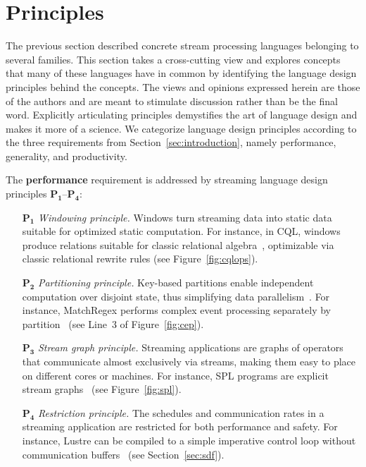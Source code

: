 \section{Principles}\label{sec:principles}

The previous section described concrete stream processing languages
belonging to several families. This section takes a cross-cutting view
and explores concepts that many of these languages have in common by
identifying the language design principles behind the concepts.
The views and opinions expressed herein are those of the authors and
are meant to stimulate discussion rather than be the final word.
Explicitly articulating principles demystifies the art of language
design and makes it more of a science. We categorize language design
principles according to the three requirements from
Section~\ref{sec:introduction}, namely performance, generality, and
productivity.

The \textbf{performance} requirement is addressed by streaming
language design principles $\mathbf{P_1}$--$\mathbf{P_4}$:
\begin{itemize}[leftmargin=6mm]
  \item[$\mathbf{P_1}$] \emph{Windowing principle.} Windows turn streaming
    data into static data suitable for optimized static computation.
    For instance, in CQL, windows produce relations suitable for
    classic relational algebra~\cite{arasu_babu_widom_2006},
    optimizable via classic relational rewrite rules (see
    Figure~\ref{fig:cqlops}).
  \item[$\mathbf{P_2}$] \emph{Partitioning principle.} Key-based partitions
    enable independent computation over disjoint state, thus
    simplifying data parallelism~\cite{schneider_et_al_2015}.
    For instance, MatchRegex performs complex event processing separately by
    partition~\cite{hirzel_2012} (see Line~3 of Figure~\ref{fig:cep}).
  \item[$\mathbf{P_3}$] \emph{Stream graph principle.} Streaming
    applications are graphs of operators that communicate almost
    exclusively via streams, making them easy to place on different
    cores or machines. For instance, SPL programs are explicit stream
    graphs~\cite{hirzel_schneider_gedik_2017} (see
    Figure~\ref{fig:spl}).
  \item[$\mathbf{P_4}$] \emph{Restriction principle.} The schedules and
    communication rates in a streaming application are restricted for
    both performance and safety. For instance, Lustre can be compiled
    to a simple imperative control loop without communication
    buffers~\cite{lustre_1987} (see Section~\ref{sec:sdf}).
\end{itemize}

